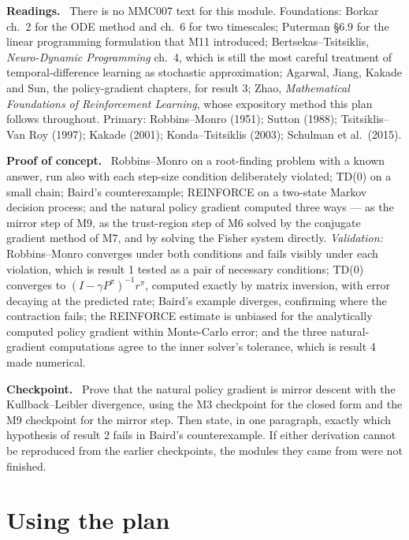 \documentclass[11pt,a4paper]{article}
\newcommand{\mpart}[1]{\smallskip\noindent\textbf{#1}\ \ignorespaces}
\begin{document}
\mpart{Readings.} There is no MMC007 text for this module. Foundations: Borkar ch.~2 for the
ODE method and ch.~6 for two timescales; Puterman \S 6.9 for the linear programming formulation
that M11 introduced; Bertsekas--Tsitsiklis, \emph{Neuro-Dynamic Programming} ch.~4, which is
still the most careful treatment of temporal-difference learning as stochastic approximation;
Agarwal, Jiang, Kakade and Sun, the policy-gradient chapters, for result 3;
Zhao, \emph{Mathematical Foundations of Reinforcement Learning}, whose expository method this
plan follows throughout. Primary: Robbins--Monro (1951); Sutton (1988);
Tsitsiklis--Van Roy (1997); Kakade (2001); Konda--Tsitsiklis (2003); Schulman et al.\ (2015).

\mpart{Proof of concept.} Robbins--Monro on a root-finding problem with a known answer, run
also with each step-size condition deliberately violated; TD(0) on a small chain; Baird's
counterexample; REINFORCE on a two-state Markov decision process; and the natural policy
gradient computed three ways --- as the mirror step of M9, as the trust-region step of M6
solved by the conjugate gradient method of M7, and by solving the Fisher system directly.
\emph{Validation:} Robbins--Monro converges under both conditions and fails visibly under each
violation, which is result 1 tested as a pair of necessary conditions; TD(0) converges to
$(I-\gamma P^\pi)^{-1}r^\pi$, computed exactly by matrix inversion, with error decaying at the
predicted rate; Baird's example diverges, confirming where the contraction fails; the REINFORCE
estimate is unbiased for the analytically computed policy gradient within Monte-Carlo error;
and the three natural-gradient computations agree to the inner solver's tolerance, which is
result 4 made numerical.

\mpart{Checkpoint.} Prove that the natural policy gradient is mirror descent with the
Kullback--Leibler divergence, using the M3 checkpoint for the closed form and the M9 checkpoint
for the mirror step. Then state, in one paragraph, exactly which hypothesis of result 2 fails
in Baird's counterexample. If either derivation cannot be reproduced from the earlier
checkpoints, the modules they came from were not finished.

\clearpage

\section{Using the plan}
\end{document}
